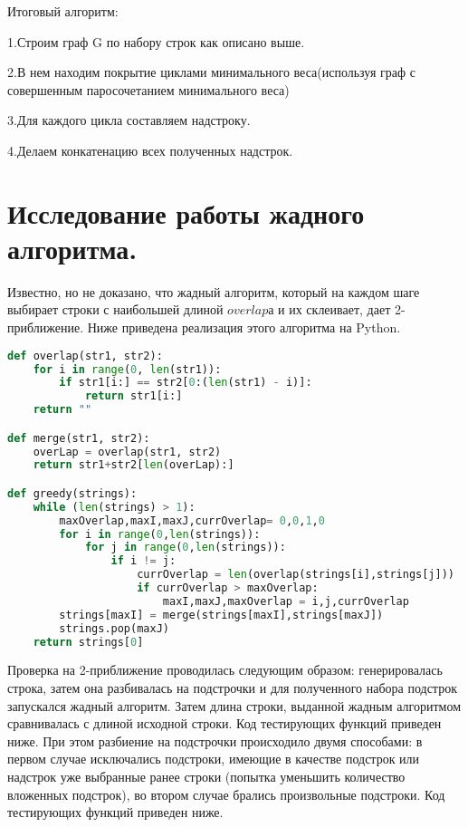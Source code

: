 \documentclass{article}
\begin{document}
Итоговый алгоритм:

1.Строим граф G по набору строк как описано выше.

2.В нем находим покрытие циклами минимального веса(используя граф с совершенным паросочетанием минимального веса)

3.Для каждого цикла составляем надстроку.

4.Делаем конкатенацию всех полученных надстрок.

\section*{Исследование работы жадного алгоритма.}
Известно, но не доказано, что жадный алгоритм, который на каждом шаге выбирает строки с наибольшей длиной $overlap$а и их склеивает, дает 2-приближение. Ниже приведена реализация этого алгоритма на Python.
\begin{lstlisting}[language=python]
def overlap(str1, str2):
    for i in range(0, len(str1)):
        if str1[i:] == str2[0:(len(str1) - i)]:
            return str1[i:]
    return ""

def merge(str1, str2):
    overLap = overlap(str1, str2)
    return str1+str2[len(overLap):]

def greedy(strings):
    while (len(strings) > 1):
        maxOverlap,maxI,maxJ,currOverlap= 0,0,1,0
        for i in range(0,len(strings)):
            for j in range(0,len(strings)):
                if i != j:
                    currOverlap = len(overlap(strings[i],strings[j]))
                    if currOverlap > maxOverlap:
                        maxI,maxJ,maxOverlap = i,j,currOverlap
        strings[maxI] = merge(strings[maxI],strings[maxJ])
        strings.pop(maxJ)
    return strings[0]
\end{lstlisting}
Проверка на 2-приближение проводилась следующим образом: генерировалась строка, затем она разбивалась на подстрочки и для полученного набора подстрок запускался жадный алгоритм. Затем длина строки, выданной жадным алгоритмом сравнивалась с длиной исходной строки. Код тестирующих функций приведен ниже.
При этом разбиение на подстрочки происходило двумя способами: в первом случае исключались подстроки, имеющие в качестве подстрок или надстрок уже выбранные ранее строки (попытка уменьшить количество вложенных подстрок), во втором случае брались произвольные подстроки. Код тестирующих функций приведен ниже.
\end{document}
